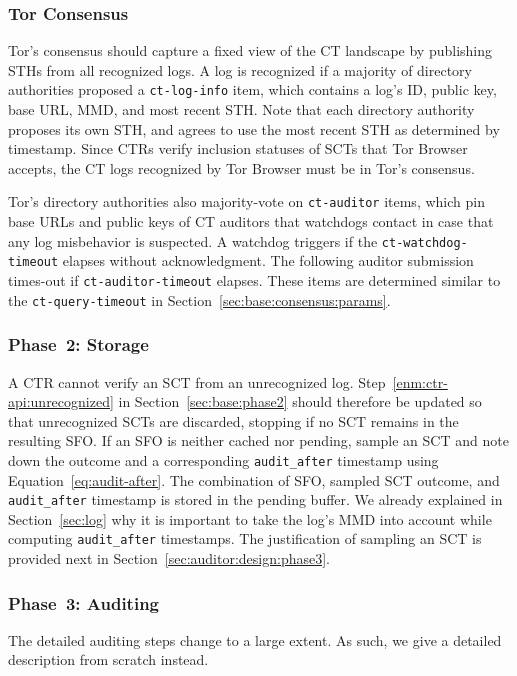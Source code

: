 \subsubsection{Tor Consensus} \label{sec:auditor:design:consensus}
Tor's consensus should capture a fixed view of the CT landscape by publishing
STHs from all recognized logs.  A log is recognized if a majority of directory
authorities proposed a \texttt{ct-log-info} item, which contains a log's ID,
public key, base URL, MMD, and most recent STH.  Note that each directory
authority proposes its own STH, and agrees to use the most recent STH as
determined by timestamp.  Since CTRs verify inclusion statuses of SCTs
that Tor Browser accepts, the CT logs recognized by Tor Browser must be in
Tor's consensus.

Tor's directory authorities also majority-vote on \texttt{ct-auditor} items,
which pin base URLs and public keys of CT auditors that watchdogs contact in
case that any log misbehavior is suspected.  A watchdog triggers if the
\texttt{ct-watchdog-timeout} elapses without acknowledgment.  The following
auditor submission times-out if \texttt{ct-auditor-timeout} elapses.  These
items are determined similar to the \texttt{ct-query-timeout} in
Section~\ref{sec:base:consensus:params}.

\subsubsection{Phase~2: Storage} \label{sec:auditor:design:phase2}
A CTR cannot verify an SCT from an unrecognized log.
Step~\ref{enm:ctr-api:unrecognized} in Section~\ref{sec:base:phase2} should
therefore be updated so that unrecognized SCTs are discarded, stopping if no
SCT remains in the resulting SFO.  If an SFO is neither cached nor pending,
sample an SCT and note down the outcome and a corresponding
\texttt{audit\_after} timestamp using Equation~\ref{eq:audit-after}.  The
combination of SFO, sampled SCT outcome, and \texttt{audit\_after} timestamp is
stored in the pending buffer.  We already explained in Section~\ref{sec:log}
why it is important to take the log's MMD into account while computing
\texttt{audit\_after} timestamps.  The justification of sampling an SCT is
provided next in Section~\ref{sec:auditor:design:phase3}.

\subsubsection{Phase~3: Auditing} \label{sec:auditor:design:auditing}
The detailed auditing steps change to a large extent.  As such, we give a
detailed description from scratch instead.

